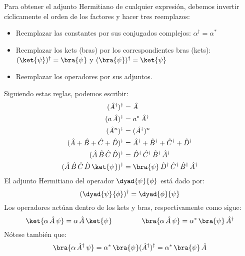 Para obtener el adjunto Hermitiano de cualquier expresión, debemos invertir cíclicamente el orden de los factores y hacer tres reemplazos:
\begin{itemize}
\item Reemplazar las constantes por sus conjugados complejos: $\alpha^{\dagger} = \alpha^{*}$
\item Reemplazar los kets (bras) por los correspondientes bras (kets): $(\ket{\psi})^{\dagger} = \bra{\psi}$ y $(\bra{\psi})^{\dagger} = \ket{\psi}$
\item Reemplazar los operadores por sus adjuntos.
\end{itemize}
Siguiendo estas reglas, podemos escribir:
\begin{align}
(\hat{A}^{\dagger})^{\dagger} &= \hat{A} \label{eq:ecuacion_02_61} \\
(a \, \hat{A})^{\dagger} &= a^{*} \, \hat{A}^{\dagger} \label{eq:ecuacion_02_62} \\
(\hat{A}^{n})^{\dagger} &= (\hat{A}^{\dagger})^{n} \label{eq:ecuacion_02_63} \\
(\hat{A} + \hat{B} + \hat{C} + \hat{D})^{\dagger} &= \hat{A}^{\dagger} + \hat{B}^{\dagger} + \hat{C}^{\dagger} + \hat{D}^{\dagger} \label{eq:ecuacion_02_64} \\
(\hat{A} \, \hat{B} \, \hat{C} \, \hat{D})^{\dagger} &= \hat{D}^{\dagger} \, \hat{C}^{\dagger} \, \hat{B}^{\dagger} \, \hat{A}^{\dagger} \label{eq:ecuacion_02_65} \\
(\hat{A} \, \hat{B} \, \hat{C} \, \hat{D} \, \ket{\psi})^{\dagger} &= \bra{\psi} \, \hat{D}^{\dagger} \, \hat{C}^{\dagger} \, \hat{B}^{\dagger} \, \hat{A}^{\dagger} \label{eq:ecuacion_02_66}
\end{align}
El adjunto Hermitiano del operador $\dyad{\psi}{\phi}$ está dado por:
\begin{equation}
(\dyad{\psi}{\phi})^{\dagger} = \dyad{\phi}{\psi}
\label{eq:ecuacion_02_67}
\end{equation}
Los operadores actúan dentro de los kets y bras, respectivamente como sigue:
\begin{equation}
\ket{\alpha \, \hat{A} \, \psi} = \alpha \, \hat{A} \, \ket{\psi} \hspace{1.5cm} \bra{\alpha \, \hat{A} \, \psi} = \alpha^{*} \, \bra{\psi} \, \hat{A}^{\dagger} \label{eq:ecuacion_02_68}
\end{equation}
Nótese también que:
\begin{align*}
\bra{\alpha \, \hat{A}^{\dagger} \, \psi} = \alpha^{*} \, \bra{\psi} (\hat{A}^{\dagger})^{\dagger} = \alpha^{*} \, \bra{\psi} \, \hat{A}
\end{align*}
